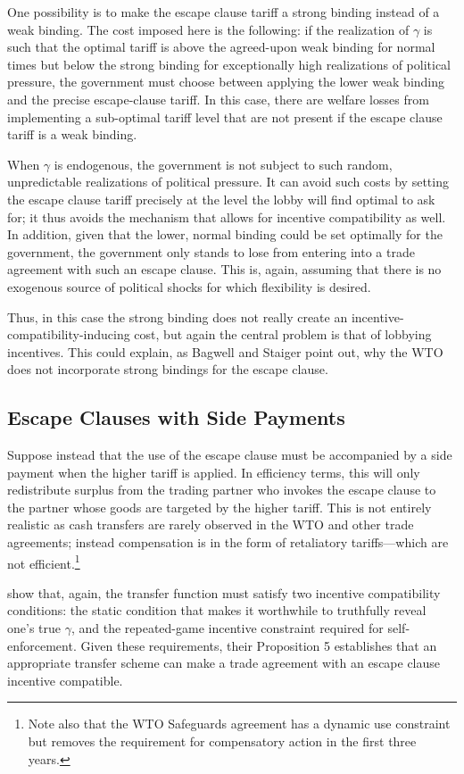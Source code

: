 \documentclass[12pt]{article}
\newcommand{\ga}{\gamma}
\begin{document}
One possibility is to make the escape clause tariff a strong binding instead of a weak binding. The cost imposed here is the following: if the realization of $\ga$ is such that the optimal tariff is above the agreed-upon weak binding for normal times but below the strong binding for exceptionally high realizations of political pressure, the government must choose between applying the lower weak binding and the precise escape-clause tariff. In this case, there are welfare losses from implementing a sub-optimal tariff level that are not present if the escape clause tariff is a weak binding.

When $\ga$ is endogenous, the government is not subject to such random, unpredictable realizations of political pressure. It can avoid such costs by setting the escape clause tariff precisely at the level the lobby will find optimal to ask for; it thus avoids the mechanism that allows for incentive compatibility as well. In addition, given that the lower, normal binding could be set optimally for the government, the government only stands to lose from entering into a trade agreement with such an escape clause. This is, again, assuming that there is no exogenous source of political shocks for which flexibility is desired.

Thus, in this case the strong binding does not really create an incentive-compatibility-inducing cost, but again the central problem is that of lobbying incentives. This could explain, as Bagwell and Staiger point out, why the WTO does not incorporate strong bindings for the escape clause.

\subsection{Escape Clauses with Side Payments}
Suppose instead that the use of the escape clause must be accompanied by a side payment when the higher tariff is applied. In efficiency terms, this will only redistribute surplus from the trading partner who invokes the escape clause to the partner whose goods are targeted by the higher tariff. This is not entirely realistic as cash transfers are rarely observed in the WTO and other trade agreements; instead compensation is in the form of retaliatory tariffs---which are not efficient.\footnote{Note also that the WTO Safeguards agreement has a dynamic use constraint but removes the requirement for compensatory action in the first three years.}

\Textcite{bs2005} show that, again, the transfer function must satisfy two incentive compatibility conditions: the static condition that makes it worthwhile to truthfully reveal one's true $\ga$, and the repeated-game incentive constraint required for self-enforcement. Given these requirements, their Proposition 5 establishes that an appropriate transfer scheme can make a trade agreement with an escape clause incentive compatible.
\end{document}
